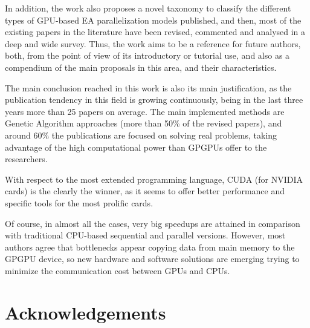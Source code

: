 \documentclass{article}
\begin{document}
In addition, the work also proposes a novel taxonomy to classify the different types of GPU-based EA parallelization models published, and then, most of the existing papers in the literature have been revised, commented and analysed in a deep and wide survey.
Thus, the work aims to be a reference for future authors, both, from the point of view of its introductory or tutorial use, and also as a compendium of the main proposals in this area, and their characteristics.

The main conclusion reached in this work is also its main justification, as the publication tendency in this field is growing continuously, being in the last three years more than 25 papers on average. The main implemented methods are Genetic Algorithm approaches (more than 50\% of the revised papers), and around 60\% the publications are focused on solving real problems, taking advantage of the high computational power than GPGPUs offer to the researchers.

With respect to the most extended programming language, CUDA (for NVIDIA cards) is the clearly the winner, as it seems to offer better performance and specific tools for the most prolific cards.

Of course, in almost all the cases, very big speedups are attained in comparison with traditional CPU-based sequential and parallel versions. However, most authors agree that bottlenecks appear copying data from main memory to the GPGPU device, so new hardware and software solutions are emerging trying to minimize
the communication cost between GPUs and CPUs. 




\section*{Acknowledgements}
\end{document}
